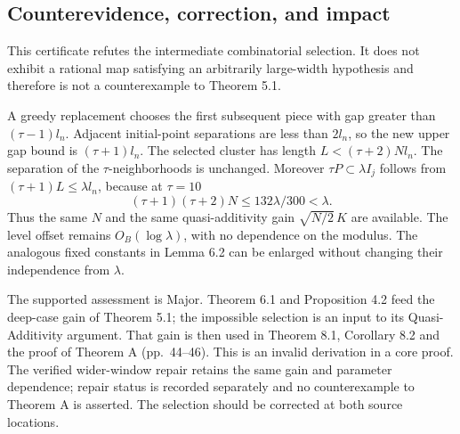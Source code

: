 \documentclass[10pt]{article}
\begin{document}
\subsection*{Counterevidence, correction, and impact}
This certificate refutes the intermediate combinatorial selection. It does not exhibit a rational map satisfying an arbitrarily large-width hypothesis and therefore is not a counterexample to Theorem 5.1.\par
A greedy replacement chooses the first subsequent piece with gap greater than \((\tau-1)l_n\). Adjacent initial-point separations are less than \(2l_n\), so the new upper gap bound is \((\tau+1)l_n\). The selected cluster has length \(L<(\tau+2)Nl_n\). The separation of the \(\tau\)-neighborhoods is unchanged. Moreover \(\tau P\subset\lambda I_j\) follows from \((\tau+1)L\leq\lambda l_n\), because at \(\tau=10\) \[(\tau+1)(\tau+2)N\leq 132\lambda/300<\lambda .\] Thus the same \(N\) and the same quasi-additivity gain \(\sqrt{N/2}\,K\) are available. The level offset remains \(O_B(\log\lambda)\), with no dependence on the modulus. The analogous fixed constants in Lemma 6.2 can be enlarged without changing their independence from \(\lambda\).\par
The supported assessment is Major. Theorem 6.1 and Proposition 4.2 feed the deep-case gain of Theorem 5.1; the impossible selection is an input to its Quasi-Additivity argument. That gain is then used in Theorem 8.1, Corollary 8.2 and the proof of Theorem A (pp. 44–46). This is an invalid derivation in a core proof. The verified wider-window repair retains the same gain and parameter dependence; repair status is recorded separately and no counterexample to Theorem A is asserted. The selection should be corrected at both source locations.\par
\end{document}
